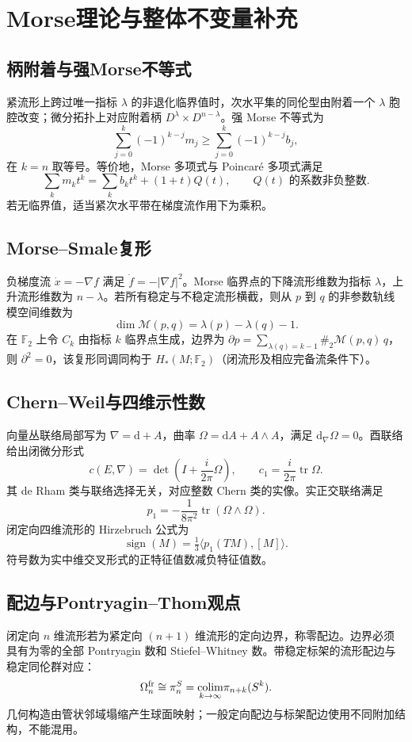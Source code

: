 \documentclass[../main.tex]{subfiles}
\begin{document}
\section{Morse理论与整体不变量补充}
\subsection{柄附着与强Morse不等式}
紧流形上跨过唯一指标 $\lambda$ 的非退化临界值时，次水平集的同伦型由附着一个 $\lambda$ 胞腔改变；微分拓扑上对应附着柄 $D^\lambda\times D^{n-\lambda}$。强 Morse 不等式为
\[
\sum_{j=0}^k(-1)^{k-j}m_j\ge\sum_{j=0}^k(-1)^{k-j}b_j,
\]
在 $k=n$ 取等号。等价地，Morse 多项式与 Poincaré 多项式满足
\[
\sum_km_kt^k=\sum_kb_kt^k+(1+t)Q(t),\qquad Q(t)\text{ 的系数非负整数}.
\]
若无临界值，适当紧次水平带在梯度流作用下为乘积。
\subsection{Morse--Smale复形}
负梯度流 $\dot x=-\nabla f$ 满足 $\dot f=-|\nabla f|^2$。Morse 临界点的下降流形维数为指标 $\lambda$，上升流形维数为 $n-\lambda$。若所有稳定与不稳定流形横截，则从 $p$ 到 $q$ 的非参数轨线模空间维数为
\[
\dim\mathcal M(p,q)=\lambda(p)-\lambda(q)-1.
\]
在 $\mathbb F_2$ 上令 $C_k$ 由指标 $k$ 临界点生成，边界为 $\partial p=\sum_{\lambda(q)=k-1}\#_2\mathcal M(p,q)\,q$，则 $\partial^2=0$，该复形同调同构于 $H_*(M;\mathbb F_2)$（闭流形及相应完备流条件下）。
\subsection{Chern--Weil与四维示性数}
向量丛联络局部写为 $\nabla=\mathrm d+A$，曲率 $\Omega=\mathrm dA+A\wedge A$，满足 $\mathrm d_\nabla\Omega=0$。酉联络给出闭微分形式
\[
c(E,\nabla)=\det\left(I+\frac{i}{2\pi}\Omega\right),\qquad
c_1=\frac i{2\pi}\operatorname{tr}\Omega.
\]
其 de Rham 类与联络选择无关，对应整数 Chern 类的实像。实正交联络满足
\[
p_1=-\frac1{8\pi^2}\operatorname{tr}(\Omega\wedge\Omega).
\]
闭定向四维流形的 Hirzebruch 公式为
\[
\operatorname{sign}(M)=\tfrac13\langle p_1(TM),[M]\rangle.
\]
符号数为实中维交叉形式的正特征值数减负特征值数。
\subsection{配边与Pontryagin--Thom观点}
闭定向 $n$ 维流形若为紧定向 $(n+1)$ 维流形的定向边界，称零配边。边界必须具有为零的全部 Pontryagin 数和 Stiefel--Whitney 数。带稳定标架的流形配边与稳定同伦群对应：
\[
\Omega_n^{\rm fr}\cong\pi_n^S=\underset{k\to\infty}{\operatorname{colim}}\pi_{n+k}(S^k).
\]
几何构造由管状邻域塌缩产生球面映射；一般定向配边与标架配边使用不同附加结构，不能混用。
\end{document}
